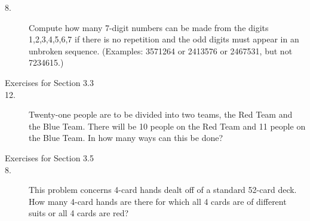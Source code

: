 \documentclass{article}
\begin{document}
\begin{description}
\item[8.] Compute how many 7-digit numbers can be made from the digits
  1,2,3,4,5,6,7 if there is no repetition and the odd digits
  must appear in an unbroken sequence.  (Examples: 3571264 or 2413576 or
  2467531, but not 7234615.)

\item[Exercises for Section 3.3]

\item[12.] Twenty-one people are to be divided into two teams, the Red
  Team and the Blue Team.  There will be 10 people on the Red Team and
  11 people on the Blue Team.  In how many ways can this be done?

\item[Exercises for Section 3.5]


\item[8.] This problem concerns 4-card hands dealt off of a standard
  52-card deck.  How many 4-card hands are there for which all 4 cards
  are of different suits or all 4 cards are red?




\end{description}
\end{document}

